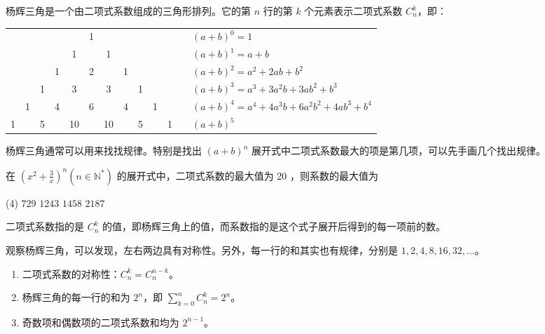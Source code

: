 \begin{definition}
    杨辉三角是一个由二项式系数组成的三角形排列。它的第 $n$ 行的第 $k$ 个元素表示二项式系数 $C_n^k$，即：
    \begin{center}
        \begin{tabular}{*{11}{c}l}
              &   &   &   &    & 1 &    &   &   &   &   & $\quad (a+b)^0 = 1$                                   \\
              &   &   &   & 1  &   & 1  &   &   &   &   & $\quad (a+b)^1 = a + b$                               \\
              &   &   & 1 &    & 2 &    & 1 &   &   &   & $\quad (a+b)^2 = a^2 + 2ab + b^2$                     \\
              &   & 1 &   & 3  &   & 3  &   & 1 &   &   & $\quad (a+b)^3 = a^3 + 3a^2b + 3ab^2 + b^3$           \\
              & 1 &   & 4 &    & 6 &    & 4 &   & 1 &   & $\quad (a+b)^4 = a^4 + 4a^3b + 6a^2b^2 + 4ab^3 + b^4$ \\
            1 &   & 5 &   & 10 &   & 10 &   & 5 &   & 1 & $\quad (a+b)^5$                                       \\
        \end{tabular}
    \end{center}
\end{definition}

杨辉三角通常可以用来找找规律。特别是找出 $(a+b)^n$ 展开式中二项式系数最大的项是第几项，可以先手画几个找出规律。

\begin{example}
    在 $\left(x^{2}+\frac{3}{x}\right)^{n}\left(n \in \mathbb{N}^{*}\right)$ 的展开式中，二项式系数的最大值为 20 ，则系数的最大值为
    \begin{tasks}(4)
        \task $729$
        \task $1243$
        \task $1458$
        \task $2187$
    \end{tasks}
\end{example}

\begin{tips}
    二项式系数指的是 $C_n^k$ 的值，即杨辉三角上的值，而系数指的是这个式子展开后得到的每一项前的数。
\end{tips}

\begin{note}
    \vspace{3cm}
\end{note}

\begin{theorem}
    观察杨辉三角，可以发现，左右两边具有对称性。另外，每一行的和其实也有规律，分别是 $1, 2, 4, 8, 16, 32, ...$。
    \begin{enumerate}
        \item 二项式系数的对称性：$C_n^k = C_n^{n-k}$。
        \item 杨辉三角的每一行的和为 $2^n$，即 $\sum_{k=0}^{n} C_n^k = 2^n$。
        \item 奇数项和偶数项的二项式系数和均为 $2^{n-1}$。
    \end{enumerate}
\end{theorem}

